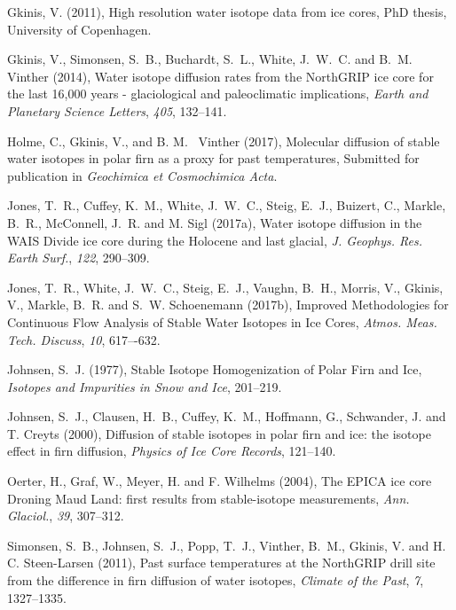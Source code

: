 \documentclass[draft, jgrga]{AGUTeX}
\begin{document}
\begin{article}
\begin{thebibliography}{}
Gkinis, V. (2011),
{ High resolution water isotope data from ice cores},
PhD thesis, University of Copenhagen.

Gkinis, V., Simonsen, S.~B., Buchardt, S.~L., White, J.~W.~C. and  B.~M. Vinther (2014),
{Water isotope diffusion rates from the NorthGRIP ice core for the last 16,000 years - glaciological and paleoclimatic implications},
\textit{Earth and Planetary Science Letters}, \textit{405}, 132--141.

Holme, C., Gkinis, V., and B. M. ~Vinther (2017), Molecular
diffusion of stable water isotopes in polar firn as a proxy
for past temperatures, Submitted for publication in \textit{Geochimica et Cosmochimica Acta}.

Jones, T.~R., Cuffey, K.~M., White, J.~W.~C., Steig, E.~J., Buizert, C.,
Markle, B.~R., McConnell, J.~R. and M. Sigl (2017a),
{Water isotope diffusion in the WAIS Divide ice core
	during the Holocene and last glacial},
\textit{J. Geophys. Res. Earth Surf.}, \textit{122}, 290–309.

Jones, T.~R., White, J.~W.~C., Steig, E.~J., Vaughn, B.~H., Morris, V.,
Gkinis, V., Markle, B.~R. and S.~W. Schoenemann (2017b),
{Improved Methodologies for Continuous Flow Analysis of Stable
Water Isotopes in Ice Cores},
\textit{Atmos. Meas. Tech. Discuss}, \textit{10}, 617–-632.

Johnsen, S.~J. (1977),
{Stable Isotope Homogenization of Polar Firn and Ice},
\textit{Isotopes and Impurities in Snow and Ice}, 201--219.

Johnsen, S.~J., Clausen, H.~B., Cuffey, K.~M., Hoffmann, G., Schwander, J. and T. Creyts (2000),
{Diffusion of stable isotopes in polar firn and ice: the isotope effect in firn diffusion},
\textit{Physics of Ice Core Records}, 121--140.

Oerter, H., Graf, W., Meyer, H. and F. Wilhelms (2004),
{The EPICA ice core Droning Maud Land: first results from stable-isotope measurements},
\textit{Ann. Glaciol.}, \textit{39}, 307--312.

Simonsen, S.~B., Johnsen, S.~J., Popp, T.~J., Vinther, B.~M., Gkinis, V. and H. C. Steen-Larsen (2011),
{Past surface temperatures at the NorthGRIP drill site from the difference in firn diffusion of water isotopes},
\textit{Climate of the Past}, \textit{7}, 1327--1335.


\end{thebibliography}
\end{article}
\end{document}
